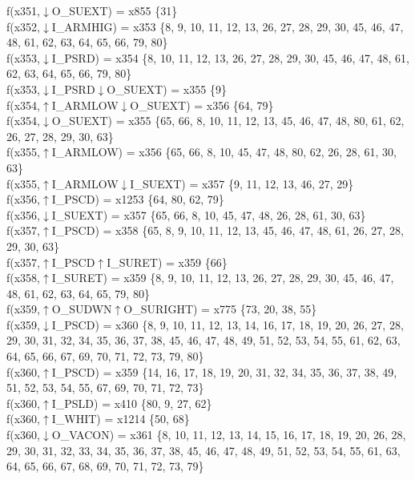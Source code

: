 f(x351,$\downarrow$O\_SUEXT) = x855 \{31\} \\  
f(x352,$\downarrow$I\_ARMHIG) = x353 \{8, 9, 10, 11, 12, 13, 26, 27, 28, 29, 30, 45, 46, 47, 48, 61, 62, 63, 64, 65, 66, 79, 80\} \\  
f(x353,$\downarrow$I\_PSRD) = x354 \{8, 10, 11, 12, 13, 26, 27, 28, 29, 30, 45, 46, 47, 48, 61, 62, 63, 64, 65, 66, 79, 80\} \\  
f(x353,$\downarrow$I\_PSRD$\downarrow$O\_SUEXT) = x355 \{9\} \\  
f(x354,$\uparrow$I\_ARMLOW$\downarrow$O\_SUEXT) = x356 \{64, 79\} \\  
f(x354,$\downarrow$O\_SUEXT) = x355 \{65, 66, 8, 10, 11, 12, 13, 45, 46, 47, 48, 80, 61, 62, 26, 27, 28, 29, 30, 63\} \\  
f(x355,$\uparrow$I\_ARMLOW) = x356 \{65, 66, 8, 10, 45, 47, 48, 80, 62, 26, 28, 61, 30, 63\} \\  
f(x355,$\uparrow$I\_ARMLOW$\downarrow$I\_SUEXT) = x357 \{9, 11, 12, 13, 46, 27, 29\} \\  
f(x356,$\uparrow$I\_PSCD) = x1253 \{64, 80, 62, 79\} \\  
f(x356,$\downarrow$I\_SUEXT) = x357 \{65, 66, 8, 10, 45, 47, 48, 26, 28, 61, 30, 63\} \\  
f(x357,$\uparrow$I\_PSCD) = x358 \{65, 8, 9, 10, 11, 12, 13, 45, 46, 47, 48, 61, 26, 27, 28, 29, 30, 63\} \\  
f(x357,$\uparrow$I\_PSCD$\uparrow$I\_SURET) = x359 \{66\} \\  
f(x358,$\uparrow$I\_SURET) = x359 \{8, 9, 10, 11, 12, 13, 26, 27, 28, 29, 30, 45, 46, 47, 48, 61, 62, 63, 64, 65, 79, 80\} \\  
f(x359,$\uparrow$O\_SUDWN$\uparrow$O\_SURIGHT) = x775 \{73, 20, 38, 55\} \\  
f(x359,$\downarrow$I\_PSCD) = x360 \{8, 9, 10, 11, 12, 13, 14, 16, 17, 18, 19, 20, 26, 27, 28, 29, 30, 31, 32, 34, 35, 36, 37, 38, 45, 46, 47, 48, 49, 51, 52, 53, 54, 55, 61, 62, 63, 64, 65, 66, 67, 69, 70, 71, 72, 73, 79, 80\} \\  
f(x360,$\uparrow$I\_PSCD) = x359 \{14, 16, 17, 18, 19, 20, 31, 32, 34, 35, 36, 37, 38, 49, 51, 52, 53, 54, 55, 67, 69, 70, 71, 72, 73\} \\  
f(x360,$\uparrow$I\_PSLD) = x410 \{80, 9, 27, 62\} \\  
f(x360,$\uparrow$I\_WHIT) = x1214 \{50, 68\} \\  
f(x360,$\downarrow$O\_VACON) = x361 \{8, 10, 11, 12, 13, 14, 15, 16, 17, 18, 19, 20, 26, 28, 29, 30, 31, 32, 33, 34, 35, 36, 37, 38, 45, 46, 47, 48, 49, 51, 52, 53, 54, 55, 61, 63, 64, 65, 66, 67, 68, 69, 70, 71, 72, 73, 79\} \\  
